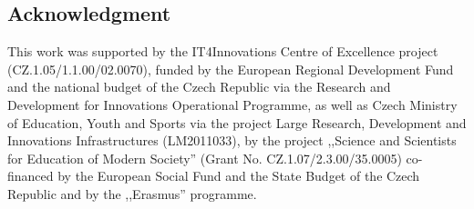 \documentclass[blues]{poster}
\begin{document}
\begin{multicols}{2}
\subsection{Acknowledgment} This work was supported by the IT4Innovations Centre of Excellence project (CZ.1.05/1.1.00/02.0070), funded by the European Regional Development Fund and the national budget of the Czech Republic via the Research and Development for Innovations Operational Programme, as well as Czech Ministry of Education, Youth and Sports via the project Large Research, Development and Innovations Infrastructures (LM2011033), by the project
,,Science and Scientists for Education of Modern Society'' (Grant No.
CZ.1.07/2.3.00/35.0005) co-financed by the European Social Fund and the State
Budget of the Czech Republic and by the ,,Erasmus'' programme.

\end{multicols}
\end{document}
